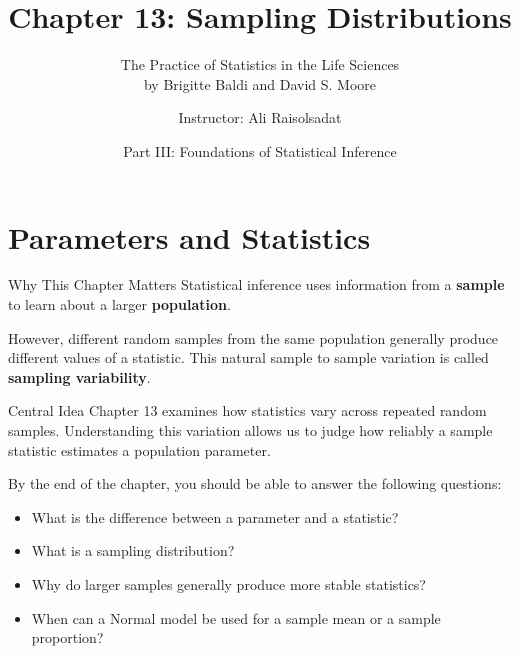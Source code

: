 \documentclass[aspectratio=169]{beamer}
\title[Chapter 13: Sampling Distributions]{\textbf{Chapter 13: Sampling Distributions}}
\subtitle{The Practice of Statistics in the Life Sciences \\ by Brigitte Baldi and David S. Moore}
\author{Instructor: Ali Raisolsadat}
\date{Part III: Foundations of Statistical Inference}
\begin{document}
\section{Parameters and Statistics}

\begin{frame}
  \titlepage
\end{frame}

\begin{frame}{Why This Chapter Matters}
Statistical inference uses information from a \textbf{sample} to learn about a larger \textbf{population}.

\vspace{0.2cm}
However, different random samples from the same population generally produce different values of a statistic. This natural sample to sample variation is called \textbf{sampling variability}.

\begin{block}{Central Idea}
Chapter 13 examines how statistics vary across repeated random samples. Understanding this variation allows us to judge how reliably a sample statistic estimates a population parameter.
\end{block}

By the end of the chapter, you should be able to answer the following questions:
\begin{itemize}
  \item What is the difference between a parameter and a statistic?
  \item What is a sampling distribution?
  \item Why do larger samples generally produce more stable statistics?
  \item When can a Normal model be used for a sample mean or a sample proportion?
\end{itemize}
\end{frame}
\end{document}
